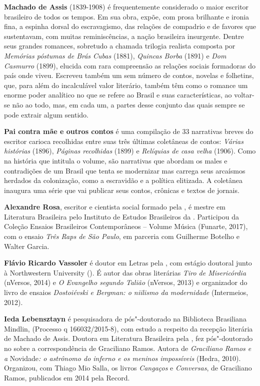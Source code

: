 \textbf{Machado de Assis} (1839-1908) é frequentemente considerado o maior escritor brasileiro de todos os tempos. Em sua obra, expõe, com prosa brilhante e ironia fina, a espinha dorsal do escravagismo, das relações de compadrio e de favores que sustentavam, com muitas reminiscências, a nação brasileira insurgente. Dentre seus grandes romances, sobretudo a chamada trilogia realista composta por \emph{Memórias póstumas de Brás Cubas} (1881), \emph{Quincas Borba} (1891) e \emph{Dom Casmurro} (1899), elucida com rara compreensão as relações sociais formadoras do país onde viveu. Escreveu também um sem número de contos, novelas e folhetins, que, para além do incalculável valor literário, também têm como o romance um enorme poder analítico no que se refere ao Brasil e suas características, ao voltar-se não ao todo, mas, em cada um, a partes desse conjunto das quais sempre se pode extrair algum sentido.

\textbf{Pai contra mãe e outros contos} é uma compilação de 33 narrativas breves do escritor carioca recolhidas entre suas três últimas coletâneas de contos: \emph{Várias histórias} (1896), \emph{Páginas recolhidas} (1899) e \emph{Relíquias de casa velha} (1906). Como na história que intitula o volume, são narrativas que abordam os males e contradições de um Brasil que tenta se modernizar mas carrega seus arcaísmos herdados da colonização, como a escravidão e a política elitizada. A coletânea inaugura uma série que vai publicar seus contos, crônicas e textos de jornais.  

\textbf{Alexandre Rosa}, escritor e
  cientista social formado pela , é mestre em Literatura
  Brasileira pelo Instituto de Estudos Brasileiros da . Participou da
  Coleção Ensaios Brasileiros Contemporâneos -- Volume Música (Funarte,
  2017), com o ensaio \emph{Três Raps de São Paulo}, em parceria com
  Guilherme Botelho e Walter Garcia.

\textbf{Flávio Ricardo Vassoler} é doutor em Letras pela , com estágio doutoral junto à
  Northwestern University (). É autor das obras literárias \emph{Tiro
  de Misericórdia} (nVersos, 2014) e \emph{O Evangelho segundo Talião}
  (nVersos, 2013) e organizador do livro de ensaios \emph{Dostoiévski e
  Bergman: o niilismo da modernidade} (Intermeios, 2012).

\textbf{Ieda Lebensztayn} é
  pesquisadora de pós"-doutorado na Biblioteca Brasiliana Mindlin,
   (Processo q 166032/2015-8), com estudo a
  respeito da recepção literária de Machado de Assis. Doutora em
  Literatura Brasileira pela , fez pós"-doutorado no 
  sobre a correspondência de Graciliano Ramos. Autora de
  \emph{Graciliano Ramos e a} Novidade\emph{: o astrônomo do inferno e
  os meninos impossíveis} (Hedra, 2010). Organizou, com Thiago Mio
  Salla, os livros \emph{Cangaços} e \emph{Conversas}, de Graciliano
  Ramos, publicados em 2014 pela Record.





